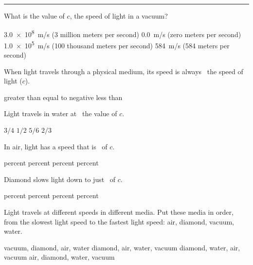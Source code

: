 \documentclass{exam}
\begin{document}
\begin{questions}
\hrule


\question
What is the value of $c$, the speed of light in a vacuum?

\begin{choices}
\correctchoice \SI{3.0e8}{m/s} (3 million meters per second)
\choice \SI{0.0}{m/s} (zero meters per second)
\choice \SI{1.0e5}{m/s} (100 thousand meters per second)
\choice \SI{584}{m/s} (584 meters per second)
\end{choices}

\question
When light travels through a physical medium, its speed is always \fillin[][0.8in]\ the speed of light ($c$).

\begin{choices}
\choice greater than
\choice equal to
\choice negative
\correctchoice less than
\end{choices}

\question
Light travels in water at \fillin\ the value of $c$.

\begin{choices}
\correctchoice $3/4$
\choice $1/2$
\choice $5/6$
\choice $2/3$
\end{choices}

\question
In air, light has a speed that is \fillin\ of $c$.

\begin{choices}
 percent
 percent
 percent
 percent
\end{choices}

\question
Diamond slows light down to just \fillin\ of $c$.

\begin{choices}
 percent
 percent
 percent
 percent
\end{choices}

\question %
Light travels at different speeds in different media. Put these media in order, from the slowest light speed to the fastest light speed: air, diamond, vacuum, water.

\begin{choices}
\choice vacuum, diamond, air, water
\choice diamond, air, water, vacuum
\correctchoice diamond, water, air, vacuum
\choice air, diamond, water, vacuum
\end{choices}


\end{questions}
\end{document}
